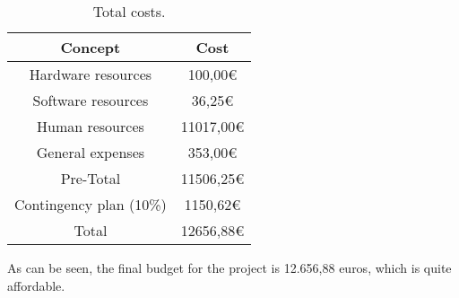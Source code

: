 \begin{table}[!htb]
\centering
  \begin{tabular}{| c | c |}
  \hline Concept & Cost \\ \hline 
  Hardware resources & 100,00€  \\ \hline
  Software resources & 36,25€        \\ \hline 
  Human resources & 11017,00€        \\ \hline 
  General expenses & 353,00€        \\ \hline 
  Pre-Total & 11506,25€  \\ \hline 
  Contingency plan (10\%) & 1150,62€        \\ \hline \hline 
  Total & 12656,88€  \\ \hline 
  \end{tabular}
  \caption{Total costs.} \vspace{3pt}
  \label{tab:total}
\end{table}

As can be seen, the final budget for the project is 12.656,88 euros, which is quite affordable.